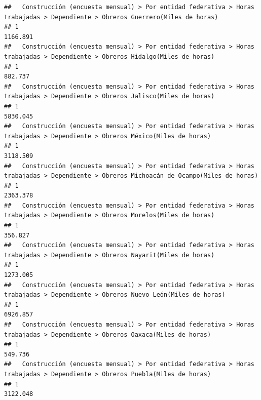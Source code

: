 \documentclass[
]{article}
\begin{document}
\begin{verbatim}
##   Construcción (encuesta mensual) > Por entidad federativa > Horas trabajadas > Dependiente > Obreros Guerrero(Miles de horas) 
## 1                                                                                                                      1166.891
##   Construcción (encuesta mensual) > Por entidad federativa > Horas trabajadas > Dependiente > Obreros Hidalgo(Miles de horas) 
## 1                                                                                                                      882.737
##   Construcción (encuesta mensual) > Por entidad federativa > Horas trabajadas > Dependiente > Obreros Jalisco(Miles de horas) 
## 1                                                                                                                     5830.045
##   Construcción (encuesta mensual) > Por entidad federativa > Horas trabajadas > Dependiente > Obreros México(Miles de horas) 
## 1                                                                                                                    3118.509
##   Construcción (encuesta mensual) > Por entidad federativa > Horas trabajadas > Dependiente > Obreros Michoacán de Ocampo(Miles de horas) 
## 1                                                                                                                                 2363.378
##   Construcción (encuesta mensual) > Por entidad federativa > Horas trabajadas > Dependiente > Obreros Morelos(Miles de horas) 
## 1                                                                                                                      356.827
##   Construcción (encuesta mensual) > Por entidad federativa > Horas trabajadas > Dependiente > Obreros Nayarit(Miles de horas) 
## 1                                                                                                                     1273.005
##   Construcción (encuesta mensual) > Por entidad federativa > Horas trabajadas > Dependiente > Obreros Nuevo León(Miles de horas) 
## 1                                                                                                                        6926.857
##   Construcción (encuesta mensual) > Por entidad federativa > Horas trabajadas > Dependiente > Obreros Oaxaca(Miles de horas) 
## 1                                                                                                                     549.736
##   Construcción (encuesta mensual) > Por entidad federativa > Horas trabajadas > Dependiente > Obreros Puebla(Miles de horas) 
## 1                                                                                                                    3122.048

\end{verbatim}
\end{document}
